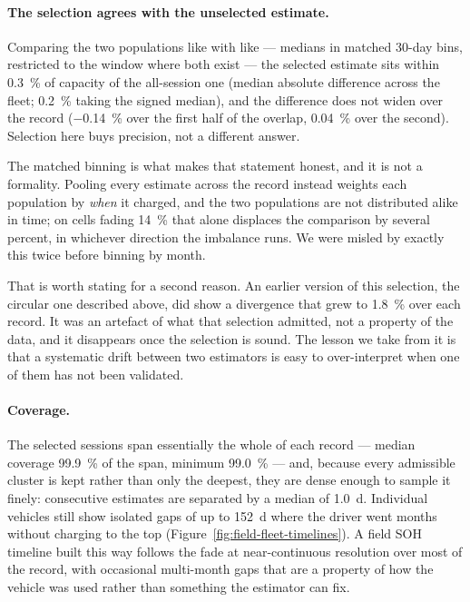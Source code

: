 \documentclass[preprint,3p,number]{elsarticle}
\begin{document}
\paragraph{The selection agrees with the unselected estimate.} Comparing the two
populations like with like --- medians in matched \num{30}-day bins, restricted
to the window where both exist --- the selected estimate sits within
\SI{0.3}{\percent} of capacity of the all-session one (median absolute
difference across the fleet; \SI{0.2}{\percent} taking the signed median), and
the difference does not widen over the record (\SI{-0.14}{\percent} over the first half of the
overlap, \SI{+0.04}{\percent} over the second). Selection here buys precision,
not a different answer.

The matched binning is what makes that statement honest, and it is not a
formality. Pooling every estimate across the record instead weights each
population by \emph{when} it charged, and the two populations are not
distributed alike in time; on cells fading \SI{14}{\percent} that alone
displaces the comparison by several percent, in whichever direction the
imbalance runs. We were misled by exactly this twice before binning by month.

That is worth stating for a second reason. An earlier version of this
selection, the circular one described above, did show a divergence that grew to
\SI{1.8}{\percent} over each record. It was an artefact of what that selection
admitted, not a property of the data, and it disappears once the selection is
sound. The lesson we take from it is that a systematic drift between two
estimators is easy to over-interpret when one of them has not been validated.

\paragraph{Coverage.} The selected sessions span essentially the whole of each
record --- median coverage \SI{99.9}{\percent} of the span, minimum
\SI{99.0}{\percent} --- and, because every
admissible cluster is kept rather than only the deepest, they are dense enough
to sample it finely: consecutive estimates are separated by a median of
\SI{1.0}{\day}. Individual vehicles still show isolated gaps of up to
\SI{152}{\day} where the driver went months without charging to the top
(Figure~\ref{fig:field-fleet-timelines}). A field SOH timeline built this way
follows the fade at near-continuous resolution over most of the record, with
occasional multi-month gaps that are a property of how the vehicle was used
rather than something the estimator can fix.
\end{document}
